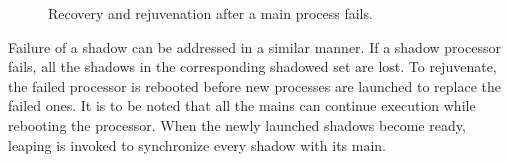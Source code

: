 
\begin{figure}[!t]
	\begin{center}
	\end{center}
	\caption{Recovery and rejuvenation after a main process fails.}
	\label{fig:rejuvenation}
\end{figure}

Failure of a shadow can be addressed in a similar manner. If a shadow processor fails, all the shadows in the corresponding shadowed set are lost. To rejuvenate, the failed processor is rebooted before new processes are launched to replace the failed ones. It is to be noted that all the mains can continue execution while rebooting the processor. When the newly launched shadows become ready, leaping is invoked to synchronize every shadow with its main.

